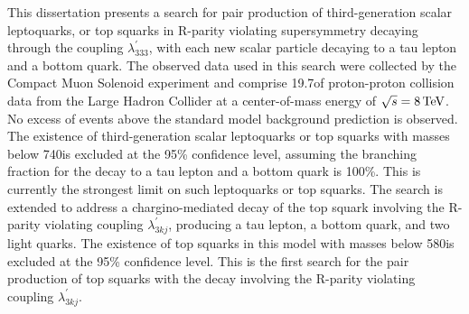 This dissertation presents a search for pair production of third-generation scalar leptoquarks, or top squarks in R-parity violating supersymmetry decaying through the coupling $\lambda^{\prime}_{333}$, with each new scalar particle decaying to a tau lepton and a bottom quark. The observed data used in this search were collected by the Compact Muon Solenoid experiment and comprise 19.7\fbinv of proton-proton collision data from the Large Hadron Collider at a center-of-mass energy of $\sqrt{s}=8\,\text{Te\hspace{-.08em}V}$. No excess of events above the standard model background prediction is observed. The existence of third-generation scalar leptoquarks or top squarks with masses below 740\GeV is excluded at the 95\% confidence level, assuming the branching fraction for the decay to a tau lepton and a bottom quark is 100\%. This is currently the strongest limit on such leptoquarks or top squarks. The search is extended to address a chargino-mediated decay of the top squark involving the R-parity violating coupling $\lambda^{\prime}_{3kj}$, producing a tau lepton, a bottom quark, and two light quarks. The existence of top squarks in this model with masses below 580\GeV is excluded at the 95\% confidence level. This is the first search for the pair production of top squarks with the decay involving the R-parity violating coupling $\lambda^{\prime}_{3kj}$.


